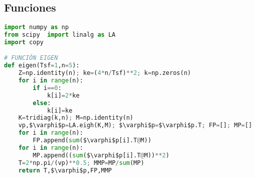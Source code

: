 \subsection*{Funciones}
{}

\begin{MyFont}
	\begin{adjustwidth}{4.8mm}{}
		\begin{lstlisting}[language=Python, caption={\footnotesize Funciones-KS}, mathescape=true,label={Algoritmo2}]
import numpy as np
from scipy  import linalg as LA
import copy

# FUNCIÓN EIGEN
def eigen(Tsf=1,n=5):
    Z=np.identity(n); ke=(4*n/Tsf)**2; k=np.zeros(n)
    for i in range(n):
        if i==0:
            k[i]=2*ke
        else:
            k[i]=ke
    K=tridiag(k,n); M=np.identity(n)
    vp,$\varphi$p=LA.eigh(K,M); $\varphi$p=$\varphi$p.T; FP=[]; MP=[]
    for i in range(n):
        FP.append(sum($\varphi$p[i].T@M))
    for i in range(n):
        MP.append((sum($\varphi$p[i].T@M))**2)
    T=2*np.pi/(vp)**0.5; MMP=MP/sum(MP)
    return T,$\varphi$p,FP,MMP

\end{lstlisting}
	\end{adjustwidth}
\end{MyFont}
